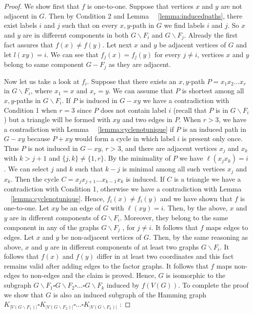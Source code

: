 \documentclass[12pt,a4paper,titlepage,openany]{report}
\begin{document}
\begin{proof}
We show first that $f$ is one-to-one. Suppose that vertices $x$ and $y$ are not adjacent in $G$. Then by Condition 2 and Lemma ~~\ref{lemma:inducedpaths}, there exist labels $i$ and $j$ such that on every $x, y$-path in $G$ we find labels $i$ and $j$. So $x$ and $y$ are in different components in both $G\backslash F_i$ and $G\backslash F_j$. Already the first fact assures that $f(x)\neq f(y)$. Let next $x$ and $y$ be adjacent vertices of $G$ and let $l(xy)=i$. We can see that $f_j(x)=f_j(y)$ for every $j\neq i$, vertices $x$ and $y$ belong to same component $G-F_j$ as they are adjacent.

 Now let us take a look at $f_i$. Suppose that there exists an $x, y$-path $P=x_1x_2\ldots x_r$ in $G\backslash F_i$, where $x_1=x$ and $x_r=y$. We can assume that $P$ is shortest among all $x, y$-paths in $G\backslash F_i$. If $P$ is induced in $G-xy$ we have a contradiction with Condition 1 when $r=3$ since $P$ does not contain label $i$ (recall that $P$ is in $G\backslash F_i$) but a triangle will be formed with $xy$ and two edges in $P$. When $r>3$, we have a contradiction with Lemma ~~\ref{lemma:cyclenotunique} if $P$ is an induced path in $G-xy$ because $P+xy$ would form a cycle in which label $i$  is present only once. Thus $P$ is not induced in $G-xy$, $r > 3$, and there are adjacent vertices $x_j$ and $x_k$ with $k > j+1$ and $\{j,k\}\neq \{1,r\}$. By the minimality of $P$ we have $\ell(x_jx_k)=i$. We can select $j$ and $k$ such that $k- j$ is minimal among all such vertices $x_j$ and $x_k$. Then the cycle $C=x_jx_{j+1}\ldots x_{k-1}x_k$ is induced. If $C$ is a triangle we have a contradiction with Condition 1, otherwise we have a
contradiction with Lemma ~~\ref{lemma:cyclenotunique}. Hence, $f_i(x)\neq f_i(y)$ and we have shown that $f$ is one-to-one.\newline
Let $xy$ be an edge of $G$ with $\ell(xy)=i$. Then, by the above, $x$ and $y$ are in different components of $G\backslash F_i$. Moreover, they belong to the same component in any of the graphs $G\backslash F_j$ , for $j\neq i$. It follows that $f$ maps edges to edges.\newline
Let $x$ and $y$ be non-adjacent vertices of $G$. Then, by the same reasoning as above, $x$ and $y$ are in different components of at least two graphs $G\backslash F_i$. It follows that $f(x)$ and $f(y)$ differ in at least two coordinates and this fact remains valid after adding edges to the factor graphs. It follows that $f$ maps non-edges to non-edges and the claim is proved.\newline
Hence, $G$ is isomorphic to the subgraph $G\backslash F_1\square G\backslash F_2\square \ldots \square G\backslash F_k$ induced by $f(V(G))$. To complete the proof we show that $G$ is also an induced subgraph of the Hamming graph $K_{|V(G\backslash F_1)|}\square K_{|V(G\backslash F_2)|}\square \ldots \square K_{|V(G\backslash F_k)|}$ : 
\end{proof}
\end{document}
